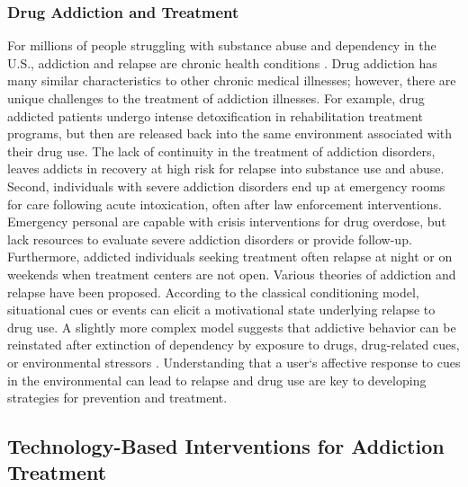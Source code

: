 \documentclass[sigconf]{acmart}
\begin{document}
\subsubsection{Drug Addiction and Treatment}

For millions of people struggling with substance abuse and dependency in 
the U.S., addiction and relapse are chronic health conditions \cite{boyer10}. 
Drug addiction has many similar characteristics to other chronic medical 
illnesses; however, there are unique challenges to the treatment of addiction
illnesses. For example, drug addicted patients undergo intense detoxification 
in rehabilitation treatment programs, but then are released back into the same 
environment associated with their drug use. The lack of continuity in the 
treatment of addiction disorders, leaves addicts in recovery at high risk for
relapse into substance use and abuse. Second, individuals with severe addiction 
disorders end up at emergency rooms for care following acute intoxication, 
often after law enforcement interventions. Emergency personal are capable with
crisis interventions for drug overdose, but lack resources to evaluate severe 
addiction disorders or provide follow-up. Furthermore, addicted individuals 
seeking treatment often relapse at night or on weekends when treatment centers 
are not open. Various theories of addiction and relapse have been proposed. 
According to the classical conditioning model, situational cues or events can 
elicit a motivational state underlying relapse to drug use. A slightly more 
complex model suggests that addictive behavior can be reinstated after 
extinction of dependency by exposure to drugs, drug-related cues, or 
environmental stressors \cite{shaham03}. Understanding that a user`s affective
response to cues in the environmental can lead to relapse and drug use are key 
to developing strategies for prevention and treatment. 

\subsection{Technology-Based Interventions for Addiction Treatment}
\end{document}
